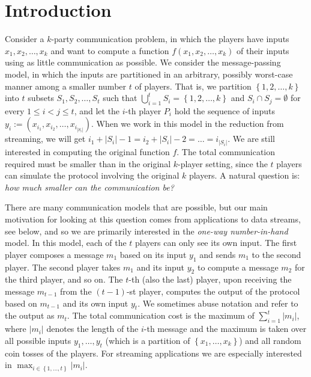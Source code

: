 \documentclass{toc}
\newcommand{\set}[1]{{\left \{{#1} \right \}}}
\newcommand{\intersect}{\ensuremath{\cap}}
\newcommand{\eqdef}{\ensuremath{:=}}
\begin{document}
\begin{frontmatter}
%

\end{frontmatter}

%
%
%


\section{Introduction}
\label{sec:intro}

Consider a $k$-party communication problem, in which the players have inputs $x_1, x_2, \ldots, x_k$ %
 and want to compute a function $f(x_1, x_2, \ldots, x_k)$ of their inputs using as little communication as possible. 
We consider the message-passing model, in which the inputs are partitioned in an arbitrary, possibly worst-case manner among a smaller number $t$ of players. 
That is, we partition $\set{1,2,\dots,k}$ into $t$ subsets $S_1, S_2, \ldots, S_t$ such that %
$\bigcup_{i=1}^t S_i = \set{1,2,\dots,k}$ %
and $S_i\intersect S_j = \emptyset$ for every $1\le i< j\le t$,
and let the $i$-th player $P_i$ hold the sequence of inputs $y_i\eqdef \left(x_{i_1}, x_{i_2}, \ldots, x_{i_{|S_i|}}\right)$. When we work in this model in the reduction from streaming, we will get $i_1 + |S_i|-1 = i_2+|S_i|-2 = \dots = i_{|S_i|}$.
We are still interested in computing the original function $f$.
The total communication required must be smaller than in the original $k$-player setting, since the $t$ players can simulate the protocol involving the original $k$ players. 
A natural question is: \emph{how much smaller can the communication be?}

There are many communication models that are possible, but our main motivation for looking at this question comes from applications to data streams, see below, and so we are primarily interested in the \emph{one-way number-in-hand} model. In this model, each of the $t$ players can only see its own input. 
The first player composes a message $m_1$ based on its input $y_1$ and sends $m_1$ to the second player. 
The second player takes $m_1$ and its input $y_2$ to compute a message $m_2$ for the third player, and so on. 
The $t$-th (also the last) player, upon receiving the message $m_{t-1}$ from the $(t-1)$-st player, computes the output of the protocol based on $m_{t-1}$ and its own input $y_t$. We sometimes abuse notation and refer to the output as $m_t$. 
The total communication cost is the maximum of $\sum_{i=1}^{t} |m_i|$, where $|m_i|$ denotes the length of the $i$-th message and the maximum is taken over all possible inputs $y_1,\ldots, y_t$ (which is a partition of $\set{x_1, \ldots, x_k}$) and all random coin tosses of the players. 
For streaming applications we are especially interested in $\max_{i\in\set{1, \ldots, t}} |m_i|$. 
\end{document}
